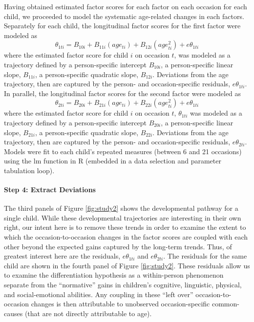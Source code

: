 \documentclass[man, floatsintext]{apa7}
\begin{document}
Having obtained estimated factor scores for each factor on each occasion
for each child, we proceeded to model the systematic age-related changes
in each factors. Separately for each child, the longitudinal factor
scores for the first factor were modeled as 
\begin{equation}
\theta_{1ti} = B_{10i} + B_{11i}(age_{ti}) + B_{12i}(age^2_{ti}) + e\theta_{1ti}
\end{equation} 
where the estimated factor score for child $i$ on
occasion $t$, was modeled as a trajectory defined by a person-specific
intercept $B_{10i}$, a person-specific linear slope, $B_{11i}$, a
person-specific quadratic slope, $B_{12i}$. Deviations from the age
trajectory, then are captured by the person- and occasion-specific
residuals, $e\theta_{1ti}$. In parallel, the longitudinal factor
scores for the second factor were modeled as 
\begin{equation}
\theta_{2ti} = B_{20i} + B_{21i}(age_{ti}) + B_{22i}(age^2_{ti}) + e\theta_{1ti}
\end{equation} where the estimated factor score for child $i$ on
occasion $t$, $\theta_{1ti}$ was modeled as a trajectory defined by
a person-specific intercept $B_{20i}$, a person-specific linear slope,
$B_{21i}$, a person-specific quadratic slope, $B_{22i}$. Deviations
from the age trajectory, then are captured by the person- and
occasion-specific residuals, $e\theta_{2ti}$. Models were fit to each
child's repeated measures (between 6 and 21 occasions) using the lm
function in R (embedded in a data selection and parameter tabulation
loop).

\paragraph{Step 4: Extract Deviations}
The third panels of Figure \ref{fig:study2} shows the developmental
pathway for a single child. While these developmental trajectories are
interesting in their own right, our intent here is to remove these
trends in order to examine the extent to which the occasion-to-occasion
changes in the factor scores are coupled with each other beyond the
expected gains captured by the long-term trends. Thus, of greatest
interest here are the residuals, $e\theta_{1ti}$ and
$e\theta_{2ti}$. The residuals for the same child are shown in the
fourth panel of Figure \ref{fig:study2}. These residuals allow us to
examine the differentiation hypothesis as a within-person phenomenon
separate from the ``normative'' gains in children's cognitive,
linguistic, physical, and social-emotional abilities. Any coupling in
these ``left over'' occasion-to-occasion changes is then attributable to
unobserved occasion-specific common-causes (that are not directly
attributable to age).
\end{document}

